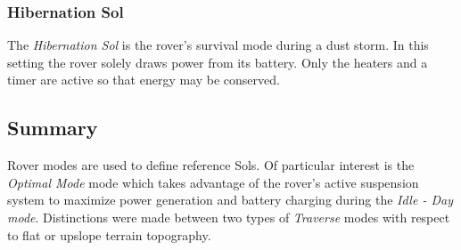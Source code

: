 %

\subsubsection{Hibernation Sol}
\label{sec:ReferenceSols:HibernationSol}
The \textit{Hibernation Sol} is the rover's survival mode during a dust storm. In this setting the rover solely draws power from its battery. Only the heaters and a timer are active so that energy may be conserved.



\subsection{Summary}
\label{sec:ReferenceSols:SummaryAndConclusion}
Rover modes are used to define reference Sols. Of particular interest is the \textit{Optimal Mode} mode which takes advantage of the rover's active suspension system to maximize power generation and battery charging during the \textit{Idle - Day mode}. Distinctions were made between two types of \textit{Traverse} modes with respect to flat or upslope terrain topography.

